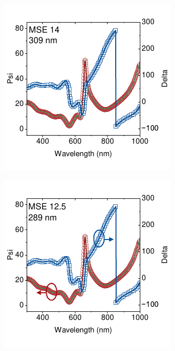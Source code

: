 \begin{figure}[t]
\begin{subfigure}[t]{0.4\textwidth}
        \caption{}
        \label{fig:ellipsometry:static_fits:t23_fixed_thick_50_void}
    \end{subfigure} 
    \begin{subfigure}[t]{0.4\textwidth}
        \centering
        \includegraphics[width=\textwidth]{chapters/ellipsometry/image/t23_fitted_thickness.pdf} %
        \caption{}
        \label{fig:ellipsometry:static_fits:t23_fitted_thick}
    \end{subfigure}
    \hspace{1cm}
    \begin{subfigure}[t]{0.4\textwidth}
        \centering
        \includegraphics[width=\textwidth]{chapters/ellipsometry/image/t23_fixed_thick_x_void_p.pdf} %

\end{subfigure}
\end{figure}
